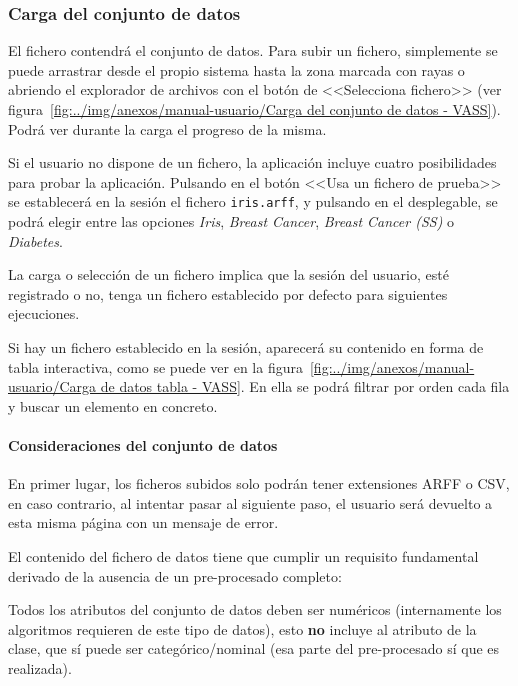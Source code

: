 \subsubsection{Carga del conjunto de datos}

El fichero contendrá el conjunto de datos. Para subir un fichero, simplemente se
puede arrastrar desde el propio sistema hasta la zona marcada con rayas o
abriendo el explorador de archivos con el botón de <<Selecciona fichero>> (ver
figura~\ref{fig:../img/anexos/manual-usuario/Carga del conjunto de datos - VASS}).
Podrá ver durante la carga el progreso de la misma.


Si el usuario no dispone de un fichero, la aplicación incluye cuatro posibilidades para probar la aplicación. Pulsando en el botón <<Usa un fichero de prueba>> se establecerá en la sesión el fichero \texttt{iris.arff}, y pulsando en el desplegable, se podrá elegir entre las opciones \textit{Iris}, \textit{Breast Cancer}, \textit{Breast Cancer (SS)} o \textit{Diabetes}.

La carga o selección de un fichero implica que la sesión del usuario, esté registrado o no, tenga un fichero establecido por defecto para siguientes ejecuciones.

Si hay un fichero establecido en la sesión, aparecerá su contenido en forma de tabla interactiva, como se puede ver en la figura~\ref{fig:../img/anexos/manual-usuario/Carga de datos tabla - VASS}. En ella se podrá filtrar por orden cada fila y buscar un elemento en concreto.


\paragraph{Consideraciones del conjunto de datos} En primer lugar, los ficheros
subidos solo podrán tener extensiones ARFF o CSV, en caso contrario, al intentar
pasar al siguiente paso, el usuario será devuelto a esta misma página con un
mensaje de error.

El contenido del fichero de datos tiene que cumplir un requisito fundamental
derivado de la ausencia de un pre-procesado completo: 

\begin{tcolorbox}[colback=red!5!white,colframe=red!75!black,fontupper=\footnotesize,title=Requisito fundamental]
	Todos los atributos del conjunto de datos deben ser numéricos (internamente los
	algoritmos requieren de este tipo de datos), esto \textbf{no} incluye al
	atributo de la clase, que sí puede ser categórico/nominal (esa parte del
	pre-procesado sí que es realizada).
\end{tcolorbox}

